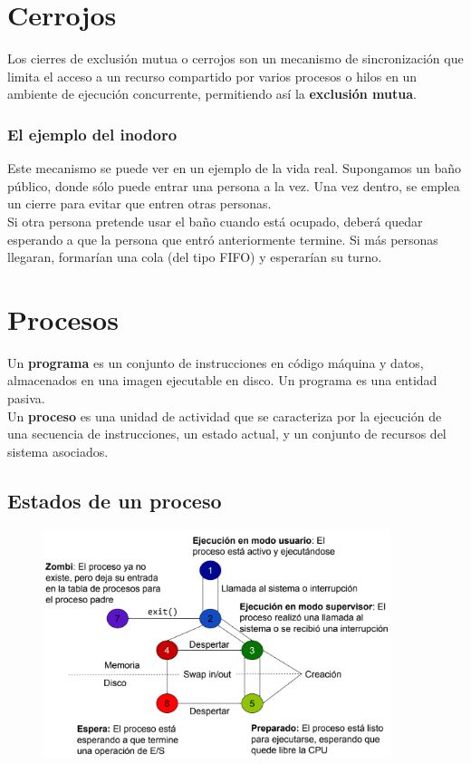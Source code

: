 \vspace{3cm}
\section{Cerrojos}
Los cierres de exclusión mutua o cerrojos son un mecanismo de sincronización que limita el acceso a un recurso compartido por varios procesos o hilos en un ambiente de ejecución concurrente, permitiendo así la \textbf{exclusión mutua}.

\subsubsection{El ejemplo del inodoro}
Este mecanismo se puede ver en un ejemplo de la vida real. Supongamos un baño público, donde sólo puede entrar una persona a la vez. Una vez dentro, se emplea un cierre para evitar que entren otras personas.\\

Si otra persona pretende usar el baño cuando está ocupado, deberá quedar esperando a que la persona que entró anteriormente termine. Si más personas llegaran, formarían una cola (del tipo FIFO) y esperarían su turno.
\newpage
\section{Procesos}
Un \textbf{programa} es un conjunto de instrucciones en código máquina y datos, almacenados en una imagen ejecutable en disco. Un programa es una entidad pasiva.\\

Un \textbf{proceso} es una unidad de actividad que se caracteriza por la ejecución de una secuencia de instrucciones, un estado actual, y un conjunto de recursos del sistema asociados.
\subsection{Estados de un proceso}
\begin{figure}[H]
\centering \includegraphics[width=0.9\textwidth]{img/ProcesEstados.png}
\end{figure}

